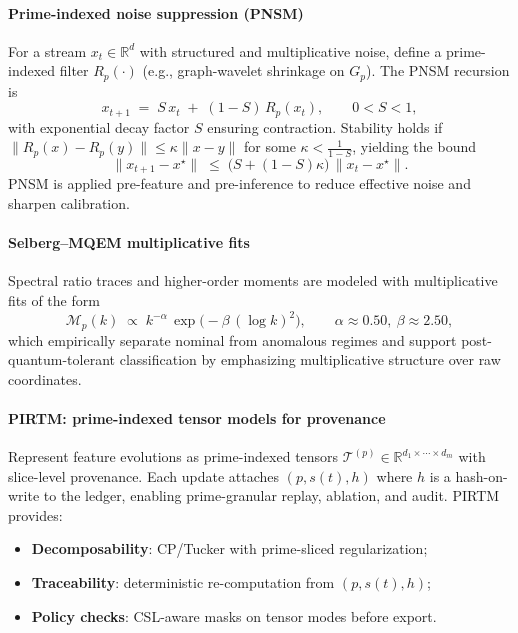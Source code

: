 \documentclass[11pt]{article}
\theoremstyle{plain}
\begin{document}
\paragraph{Prime-indexed noise suppression (PNSM)}
For a stream $x_t\in\mathbb{R}^d$ with structured and multiplicative noise, define a prime-indexed filter $R_p(\cdot)$ (e.g., graph-wavelet shrinkage on $G_p$). The PNSM recursion is
\begin{equation}
x_{t+1} \;=\; S\,x_t \;+\; (1{-}S)\,R_p(x_t), 
\qquad 0<S<1,
\label{eq:pns}
\end{equation}
with exponential decay factor $S$ ensuring contraction. Stability holds if $\|R_p(x)-R_p(y)\|\le \kappa\|x-y\|$ for some $\kappa<\frac{1}{1-S}$, yielding the bound
\[
\|x_{t+1}-x^\star\| \;\le\; \big(S+(1{-}S)\kappa\big)\,\|x_t-x^\star\|.
\]
PNSM is applied pre-feature and pre-inference to reduce effective noise and sharpen calibration.

\paragraph{Selberg--MQEM multiplicative fits}
Spectral ratio traces and higher-order moments are modeled with multiplicative fits of the form
\begin{equation}
\mathcal{M}_p(k) \;\propto\; k^{-\alpha}\,\exp\!\big(-\beta\,(\log k)^2\big),
\qquad \alpha\approx 0.50,\ \beta\approx 2.50,
\label{eq:selberg-mqem}
\end{equation}
which empirically separate nominal from anomalous regimes and support post-quantum-tolerant classification by emphasizing multiplicative structure over raw coordinates.

\paragraph{PIRTM: prime-indexed tensor models for provenance}
Represent feature evolutions as prime-indexed tensors $\mathcal{T}^{(p)}\in\mathbb{R}^{d_1\times\cdots\times d_m}$ with slice-level provenance. Each update attaches $(p,s(t),h)$ where $h$ is a hash-on-write to the ledger, enabling prime-granular replay, ablation, and audit. PIRTM provides:
\begin{itemize}
  \item \textbf{Decomposability}: CP/Tucker with prime-sliced regularization;
  \item \textbf{Traceability}: deterministic re-computation from $(p,s(t),h)$;
  \item \textbf{Policy checks}: CSL-aware masks on tensor modes before export.
\end{itemize}
\end{document}
